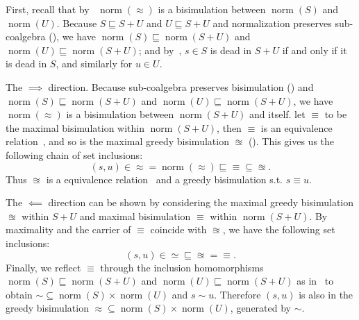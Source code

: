 \documentclass[conference]{IEEEtran}
\DeclareMathOperator{\norm}{\mathrm{norm}}
\begin{document}
\begin{proofEnd}
    First, recall that by~ \(\norm(≈)\) is a bisimulation between \(\norm(S)\) and \(\norm(U)\).
    Because \(S ⊑ S + U\) and \(U ⊑ S + U\) and normalization preserves sub-coalgebra (), we have \(\norm(S) ⊑ \norm(S + U)\) and \(\norm(U) ⊑ \norm(S + U)\); and by~, \(s ∈ S\) is dead in \(S + U\) if and only if it is dead in \(S\), and similarly for \(u ∈ U\).

    The \(⟹\) direction. 
    Because sub-coalgebra preserves bisimulation () and \(\norm(S) ⊑ \norm(S + U)\) and \(\norm(U) ⊑ \norm(S + U)\), we have \(\norm(≈)\) is a bisimulation between \(\norm(S + U)\) and itself.
    let \(≡\) to be the maximal bisimulation within \(\norm(S + U)\), then \(≡\) is an equivalence relation~\cite[Corollary 5.6]{rutten_UniversalCoalgebraTheory_2000}, and so is the maximal greedy bisimulation \(≊\) ().
    This gives us the following chain of set inclusions:
    \[(s, u) ∈ {≈} = \norm(≈) ⊑ {≡} ⊆ {≊}.\]
    Thus \(≊\) is a equivalence relation~\cite[Corollary 5.6]{rutten_UniversalCoalgebraTheory_2000} and a greedy bisimulation s.t. \(s ≡ u\).

    The \(⟸\) direction can be shown by considering the maximal greedy bisimulation \(≊\) within \(S + U\) and maximal bisimulation \(≡\) within \(\norm(S + U)\).
    By maximality and the carrier of \(≡\) coincide with \(≊\), we have the following set inclusions:
    \[(s, u) ∈ {≃} ⊑ {≊} = {≡}.\]
    Finally, we reflect \(≡\) through the inclusion homomorphisms \(\norm(S) ⊑ \norm(S + U)\) and \(\norm(U) ⊑ \norm(S + U)\) as in~ to obtain \({∼} ⊆ \norm(S) × \norm(U)\) and \(s ∼ u\).
    Therefore \((s, u)\) is also in the greedy bisimulation \({≈} ⊆ \norm(S) × \norm(U)\), generated by \(∼\).
\end{proofEnd}

\end{document}
